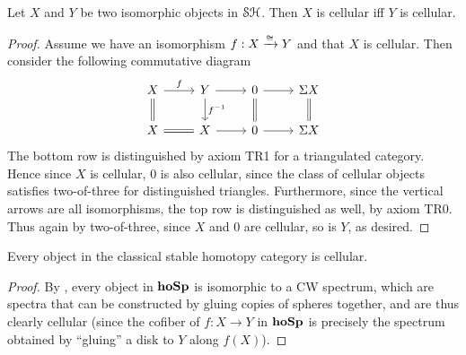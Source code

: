\documentclass[../main.tex]{subfiles}
\begin{document}
\begin{lemma}\label{cellular_closed_under_iso}
	Let $X$ and $Y$ be two isomorphic objects in $\mathcal{SH}$. Then $X$ is cellular iff $Y$ is cellular.
\end{lemma}
\begin{proof}
	Assume we have an isomorphism $f:X\xrightarrow\cong Y$ and that $X$ is cellular. Then consider the following commutative diagram
	\[\begin{tikzcd}
		X & Y & 0 & {\Sigma X} \\
		X & X & 0 & {\Sigma X}
		\arrow["f", from=1-1, to=1-2]
		\arrow[from=1-2, to=1-3]
		\arrow[from=1-3, to=1-4]
		\arrow["{f^{-1}}", from=1-2, to=2-2]
		\arrow[Rightarrow, no head, from=1-1, to=2-1]
		\arrow[Rightarrow, no head, from=2-1, to=2-2]
		\arrow[from=2-2, to=2-3]
		\arrow[from=2-3, to=2-4]
		\arrow[Rightarrow, no head, from=1-4, to=2-4]
		\arrow[Rightarrow, no head, from=1-3, to=2-3]
	\end{tikzcd}\]
	The bottom row is distinguished by axiom TR1 for a triangulated category. Hence since $X$ is cellular, $0$ is also cellular, since the class of cellular objects satisfies two-of-three for distinguished triangles. Furthermore, since the vertical arrows are all isomorphisms, the top row is distinguished as well, by axiom TR0. Thus again by two-of-three, since $X$ and $0$ are cellular, so is $Y$, as desired.
\end{proof}

\begin{example}
	Every object in the classical stable homotopy category is cellular. 
\end{example}
\begin{proof}
	By \cite[Proposition 2.16]{nlab:introduction_to_stable_homotopy_theory_--_1-1}, every object in $\mathbf{hoSp}$ is isomorphic to a CW spectrum, which are spectra that can be constructed by gluing copies of spheres together, and are thus clearly cellular (since the cofiber of $f:X\to Y$ in $\mathbf{hoSp}$ is precisely the spectrum obtained by ``gluing'' a disk to $Y$ along $f(X)$).
\end{proof}
\end{document}

